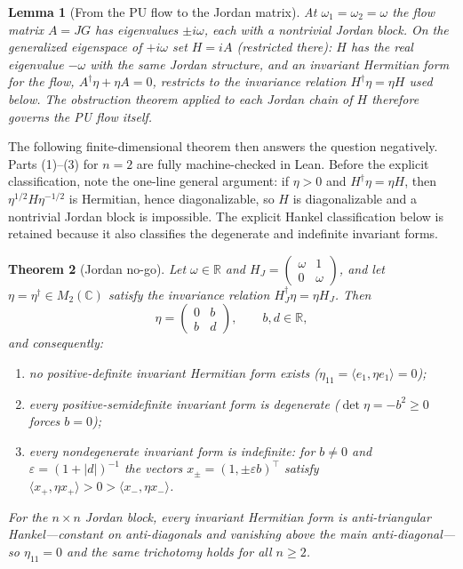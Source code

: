\documentclass[11pt]{article}
\newtheorem{theorem}{Theorem}[section]
\newtheorem{lemma}[theorem]{Lemma}
\theoremstyle{definition}
\theoremstyle{remark}
\newcommand{\C}{\mathbb{C}}
\newcommand{\R}{\mathbb{R}}
\newcommand{\w}{\omega}
\newcommand{\dg}{\dagger}
\begin{document}
\begin{lemma}[From the PU flow to the Jordan matrix]\label{lem:flowtojordan}
At $\w_1=\w_2=\w$ the flow matrix $A=JG$ has eigenvalues $\pm i\w$, each
with a nontrivial Jordan block.  On the generalized eigenspace of $+i\w$
set $H=iA$ (restricted there): $H$ has the real eigenvalue $-\w$ with the
same Jordan structure, and an invariant Hermitian form for the flow,
$A^{\dg}\eta+\eta A=0$, restricts to the invariance relation
$H^{\dg}\eta=\eta H$ used below.  The obstruction theorem applied to each
Jordan chain of $H$ therefore governs the PU flow itself.
\end{lemma}

The following finite-dimensional theorem then answers
the question negatively.  Parts (1)--(3) for $n=2$ are fully
machine-checked in Lean.  Before the explicit classification, note the
one-line general argument: if $\eta>0$ and $H^{\dg}\eta=\eta H$, then
$\eta^{1/2}H\eta^{-1/2}$ is Hermitian, hence diagonalizable, so $H$ is
diagonalizable and a nontrivial Jordan block is impossible.  The explicit
Hankel classification below is retained because it also classifies the
degenerate and indefinite invariant forms.

\begin{theorem}[Jordan no-go]\label{thm:jordan}
Let $\w\in\R$ and
$H_J=\left(\begin{smallmatrix}\w&1\\0&\w\end{smallmatrix}\right)$, and let
$\eta=\eta^{\dg}\in M_2(\C)$ satisfy the invariance relation
$H_J^{\dg}\eta=\eta H_J$.  Then
\begin{equation}
\eta=\begin{pmatrix}0&b\\ b&d\end{pmatrix},\qquad b,d\in\R ,
\end{equation}
and consequently:
\begin{enumerate}
\item no positive-definite invariant Hermitian form exists
($\eta_{11}=\langle e_1,\eta e_1\rangle=0$);
\item every positive-semidefinite invariant form is degenerate
($\det\eta=-b^2\ge0$ forces $b=0$);
\item every nondegenerate invariant form is indefinite: for $b\neq0$ and
$\varepsilon=(1+|d|)^{-1}$ the vectors $x_\pm=(1,\pm\varepsilon b)^{\top}$
satisfy $\langle x_+,\eta x_+\rangle>0>\langle x_-,\eta x_-\rangle$.
\end{enumerate}
For the $n\times n$ Jordan block, every invariant Hermitian form is
anti-triangular Hankel---constant on anti-diagonals and vanishing above the
main anti-diagonal---so $\eta_{11}=0$ and the same trichotomy holds for all
$n\ge2$.
\end{theorem}
\end{document}
